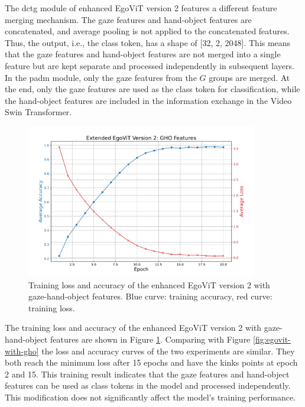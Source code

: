 The \gls{dctg} module of enhanced EgoViT version 2 features a different feature merging mechanism.  The gaze features and hand-object features are concatenated, and average pooling is not applied to the concatenated features. Thus, the output, i.e., the class token, has a shape of [32, 2, 2048]. This means that the gaze features and hand-object features are not merged into a single feature but are kept separate and processed independently in subsequent layers. In the \gls{padm} module, only the gaze features from the $G$ groups are merged. At the end, only the gaze features are used as the class token for classification, while the hand-object features are included in the information exchange in the Video Swin Transformer.\newpage

\begin{figure}[htbp]
    \centering
    \includegraphics[width=0.9\textwidth]{graphics/figure6}
    \caption{Training loss and accuracy of the enhanced EgoViT version 2 with gaze-hand-object features. Blue curve: training accuracy, red curve: training loss.}
    \label{fig:egovit_v2_GHO}
\end{figure}
\vspace{3mm}
The training loss and accuracy of the enhanced EgoViT version 2 with gaze-hand-object features are shown in Figure \ref{fig:egovit_v2_GHO}. Comparing with Figure \ref{fig:egovit-with-gho} the loss and accuracy curves of the two experiments are similar. They both reach the minimum loss after 15 epochs and have the kinks points at epoch 2 and 15. This training result indicates that the gaze features and hand-object features can be used as class tokens in the model and processed independently. This modification does not significantly affect the model's training performance.

